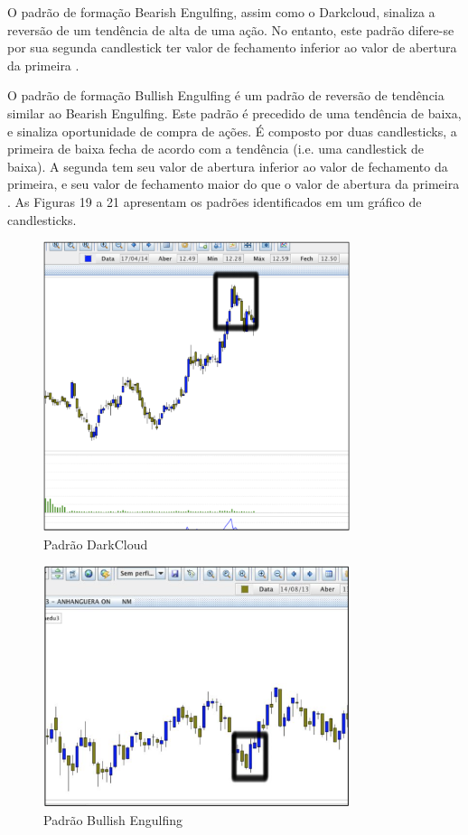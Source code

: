 O padrão de formação Bearish Engulfing, assim como o Darkcloud, sinaliza a reversão de um tendência de alta de uma ação. No entanto, este padrão difere-se por sua segunda candlestick ter valor de fechamento inferior ao valor de abertura da primeira \cite[p. 38]{bigalow2010}.

O padrão de formação Bullish Engulfing é um padrão de reversão de tendência similar ao Bearish Engulfing. Este padrão é precedido de uma tendência de baixa, e sinaliza oportunidade de compra de ações. É composto por duas candlesticks, a primeira de baixa fecha de acordo com a tendência (i.e. uma candlestick de baixa). A segunda tem seu valor de abertura inferior ao valor de fechamento da primeira, e seu valor de fechamento maior do que o valor de abertura da primeira \cite[p. 36]{bigalow2010}. As Figuras 19 a 21 apresentam os padrões identificados em um gráfico de candlesticks.

\begin{figure}[h]
\centering
\label{f19}
\includegraphics[width=0.8\textwidth]{figuras/f19}
\caption{Padrão DarkCloud}
\end{figure}

\begin{figure}[h]
\centering
\label{f20}
\includegraphics[width=0.8\textwidth]{figuras/f20}
\caption{Padrão Bullish Engulfing}
\end{figure}

